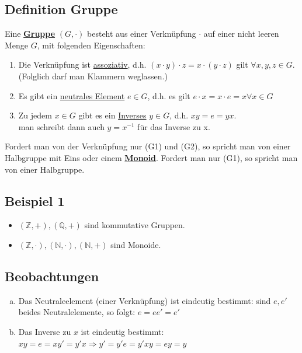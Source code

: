 \documentclass[a4paper, pagesize=pdftex, pdftex, twoside, headsepline, index=totoc,toc=listof, fontsize=10pt, cleardoublepage=empty, headinclude, DIV=13, BCOR=13mm]{scrartcl}
\newcommand{\Index}[1]{\uline{\textbf{#1}}\index{#1}} %
\begin{document}
\subsection{Definition Gruppe}
\label{sub: gef_gruppe}
Eine \Index{Gruppe} $(G,\cdot )$ besteht aus einer Verknüpfung $\cdot $ auf einer nicht leeren Menge $G$, mit folgenden Eigenschaften:
\begin{enumerate}[(G1)]
	\item Die Verknüpfung ist \uline{assoziativ}, d.h. $(x\cdot y)\cdot z = x \cdot (y \cdot z)$ gilt $\forall x,y,z \in G$.\\ 
	(Folglich darf man Klammern weglassen.)
	\item Es gibt ein \uline{neutrales Element} $e \in G$, d.h. es gilt $e\cdot x= x\cdot e= x \forall x\in G$
	\item Zu jedem $x\in G$ gibt es ein \uline{Inverses} $y \in G$, d.h. $xy=e=yx.$\\
	man schreibt dann auch $y=x^{-1}$ für das Inverse zu x.
\end{enumerate}
Fordert man von der Verknüpfung nur (G1) und (G2), so spricht man von einer Halbgruppe mit Eins oder einem \Index{Monoid}. Fordert man nur (G1), so spricht man von einer Halbgruppe.\\

\subsection{Beispiel 1}
\label{sub:beispiel_1}
\begin{itemize}
	\item $(\mathds{Z}, +), (\mathds{Q}, +)$ sind kommutative Gruppen.
	\item $(\mathds{Z},\cdot), (\mathds{N},\cdot), (\mathds{N}, +)$ sind Monoide.
\end{itemize}

\subsection{Beobachtungen}
\label{sub: beobachtungen}
\begin{enumerate}[a)]
	\item Das Neutraleelement (einer Verknüpfung) ist eindeutig bestimmt: sind $e,e'$ beides Neutralelemente, so folgt: $e=ee'=e'$
	\item Das Inverse zu $x$ ist eindeutig bestimmt:\\
	$xy=e=xy'=y'x \Rightarrow y'=y'e=y'xy=ey=y$
\end{enumerate}
\end{document}
